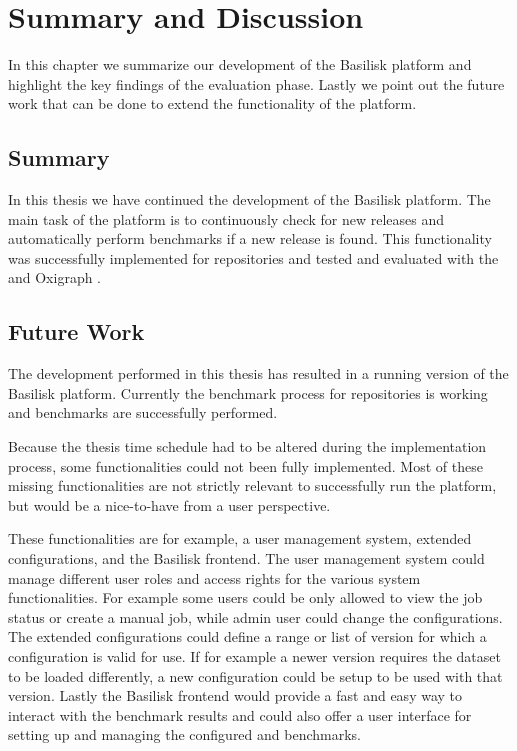 \chapter{Summary and Discussion}
\label{ch:summary}

In this chapter we summarize our development of the Basilisk platform and highlight the key findings of the evaluation phase.
Lastly we point out the future work that can be done to extend the functionality of the platform.

\section{Summary}
In this thesis we have continued the development of the Basilisk platform.
The main task of the platform is to continuously check for new \ts{} releases and automatically perform benchmarks if a new release is found.
This functionality was successfully implemented for \dockh{} repositories and tested and evaluated with the \tentris{} and Oxigraph \tsp{}.



\section{Future Work}
The development performed in this thesis has resulted in a running version of the Basilisk platform.
Currently the benchmark process for \dockh{} repositories is working and benchmarks are successfully performed.

Because the thesis time schedule had to be altered during the implementation process, some functionalities could not been fully implemented.
Most of these missing functionalities are not strictly relevant to successfully run the platform, but would be a nice-to-have from a user perspective.

These functionalities are for example, a user management system, extended \ts{} configurations, and the Basilisk frontend.
The user management system could manage different user roles and access rights for the various system functionalities.
For example some users could be only allowed to view the job status or create a manual job, while admin user could change the \ts{} configurations.
The extended \ts{} configurations could define a range or list of version for which a configuration is valid for use.
If for example a newer \ts{} version requires the dataset to be loaded differently, a new configuration could be setup to be used with that version.
Lastly the Basilisk frontend would provide a fast and easy way to interact with the benchmark results and could also offer a user interface for setting up and managing the configured \ts{} and benchmarks.

